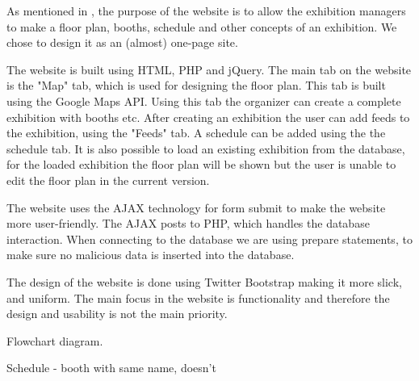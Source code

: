 As mentioned in , the purpose of the website is to allow the exhibition managers to make a floor plan, booths, schedule and other concepts of an exhibition. We chose to design it as an (almost) one-page site. 

The website is built using HTML, PHP and jQuery. The main tab on the website is the "Map" tab, which is used for designing the floor plan. This tab is built using the Google Maps API. Using this tab the organizer can create a complete exhibition with booths etc.
After creating an exhibition the user can add feeds to the exhibition, using the "Feeds" tab. A schedule can be added using the the schedule tab.
It is also possible to load an existing exhibition from the database, for the loaded exhibition the floor plan will be shown but the user is unable to edit the floor plan in the current version.

The website uses the AJAX technology for form submit to make the website more user-friendly. The AJAX posts to PHP, which handles the database interaction. When connecting to the database we are using prepare statements, to make sure no malicious data is inserted into the database.

The design of the website is done using Twitter Bootstrap making it more slick, and uniform.
The main focus in the website is functionality and therefore the design and usability is not the main priority.




Flowchart diagram. 


Schedule - booth with same name, doesn't 